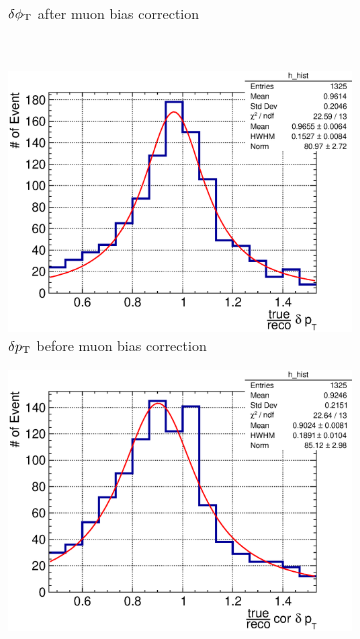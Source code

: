 \begin{figure}
\begin{subfigure}[b]{\dbfigwid\textwidth}
               \caption{$\delta\phi_\textrm{T}$ after muon bias correction}
               \label{subfig:esc-dphit-afmu-sfgmu}
          \end{subfigure}
          \\
          \begin{subfigure}[b]{\dbfigwid\textwidth}
               \centering
               \includegraphics[width=\textwidth]{figures/perf/tki/dpt_rat_hist_al11_sfgmu.eps}
               \caption{$\delta p_\textrm{T}$ before muon bias correction}
               \label{subfig:esc-dpt-bfmu-sfgmu}
          \end{subfigure}
          \begin{subfigure}[b]{\dbfigwid\textwidth}
               \centering
               \includegraphics[width=\textwidth]{figures/perf/tki/cor_dpt_rat_hist_al11_sfgmu.eps}

\end{subfigure}
\end{figure}
